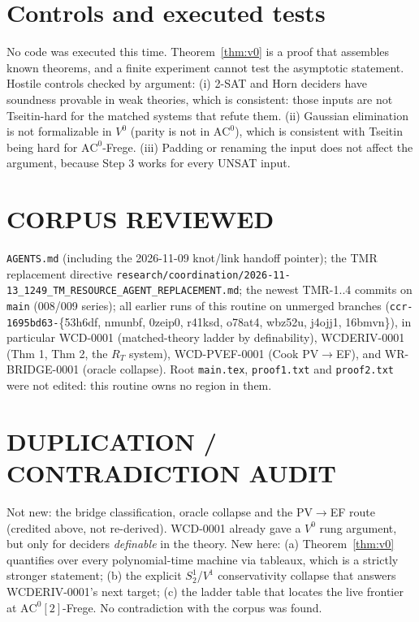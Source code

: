 \documentclass[11pt]{article}
\theoremstyle{definition}
\begin{document}
\section{Controls and executed tests}\label{sec:controls}
No code was executed this time. Theorem~\ref{thm:v0} is a proof that assembles known theorems, and a finite
experiment cannot test the asymptotic statement.
Hostile controls checked by argument:
(i) 2-SAT and Horn deciders have soundness provable in weak theories, which is consistent: those inputs are not
Tseitin-hard for the matched systems that refute them.
(ii) Gaussian elimination is not formalizable in $V^0$ (parity is not in $\mathrm{AC}^0$), which is consistent with
Tseitin being hard for $\mathrm{AC}^0$-Frege.
(iii) Padding or renaming the input does not affect the argument, because Step 3 works for every UNSAT input.

\section*{CORPUS REVIEWED}
\texttt{AGENTS.md} (including the 2026-11-09 knot/link handoff pointer); the TMR replacement directive
\texttt{research/coordination/2026-11-13\_1249\_TM\_RESOURCE\_AGENT\_REPLACEMENT.md}; the newest TMR-1..4 commits on
\texttt{main} (008/009 series); all earlier runs of this routine on unmerged branches
(\texttt{ccr-1695bd63-}\{53h6df, nmunbf, 0zeip0, r41ksd, o78at4, wbz52u, j4ojj1, 16bmvn\}), in particular
WCD-0001 (matched-theory ladder by definability), WCDERIV-0001 (Thm 1, Thm 2, the $R_T$ system),
WCD-PVEF-0001 (Cook PV$\to$EF), and WR-BRIDGE-0001 (oracle collapse).
Root \texttt{main.tex}, \texttt{proof1.txt} and \texttt{proof2.txt} were not edited: this routine owns no region in them.

\section*{DUPLICATION / CONTRADICTION AUDIT}
Not new: the bridge classification, oracle collapse and the PV$\to$EF route (credited above, not re-derived).
WCD-0001 already gave a $V^0$ rung argument, but only for deciders \emph{definable} in the theory.
New here: (a) Theorem~\ref{thm:v0} quantifies over every polynomial-time machine via tableaux, which is a
strictly stronger statement; (b) the explicit $S^1_2$/$V^1$ conservativity collapse that answers WCDERIV-0001's next target;
(c) the ladder table that locates the live frontier at $\mathrm{AC}^0[2]$-Frege.
No contradiction with the corpus was found.
\end{document}

